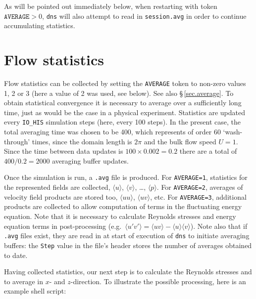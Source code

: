 \documentclass[11pt]{report}
\newcommand{\eg}{e.g.\ } \newcommand{\CC}{\mathrm{c.c.}}
\begin{document}
As will be pointed out immediately below, when restarting with token
$\texttt{AVERAGE}>0$, \verb|dns| will also attempt to read in
\verb|session.avg| in order to continue accumulating statistics.

\section{Flow statistics}
\label{sec.stats}

Flow statistics can be collected by setting the \verb|AVERAGE| token
to non-zero values 1, 2 or 3 (here a value of 2 was used, see below).
See also \S\,\ref{sec.average}.  To obtain statistical convergence it
is necessary to average over a sufficiently long time, just as would
be the case in a physical experiment. Statistics are updated every
\verb|IO_HIS| simulation steps (here, every 100 steps).  In the
present case, the total averaging time was chosen to be 400, which
represents of order 60 `wash-through' times, since the domain length
is $2\pi$ and the bulk flow speed $U=1$.  Since the time between data
updates is $100\times0.002=0.2$ there are a total of $400/0.2=2000$
averaging buffer updates.

Once the simulation is run, a \texttt{.avg} file is produced. For
\verb|AVERAGE=1|, statistics for the represented fields are collected,
\ie $\langle u\rangle$, $\langle v\rangle$, \ldots, $\langle
p\rangle$.  For \verb|AVERAGE=2|, averages of velocity field products
are stored too, \ie $\langle uu\rangle$, $\langle uv\rangle$, etc.
For \verb|AVERAGE=3|, additional products are collected to allow
computation of terms in the fluctuating energy equation.  Note that it
is necessary to calculate Reynolds stresses and energy equation terms
in post-processing (\eg $\langle u'v'\rangle = \langle
uv\rangle-\langle u\rangle\langle v\rangle$).  Note also that if
\verb|.avg| files exist, they are read in at start of execution of
\verb|dns| to initiate averaging buffers: the \verb|Step| value in the
file's header stores the number of averages obtained to date.

Having collected statistics, our next step is to calculate the
Reynolds stresses and to average in $x$- and $z$-direction. To
illustrate the possible processing, here is an example shell script:
\end{document}
